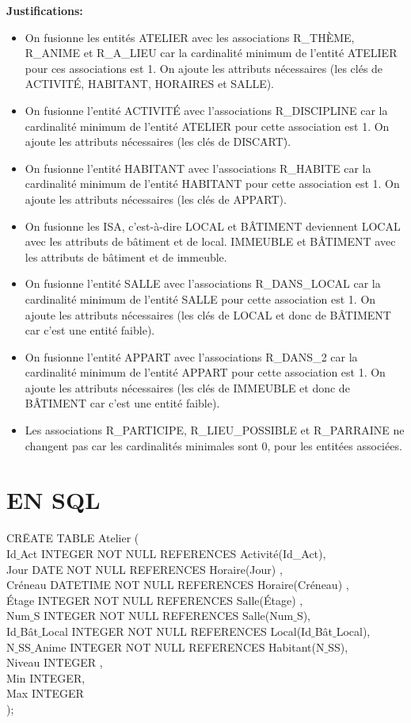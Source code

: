 \documentclass[a4paper,10.5pt]{report}
\begin{document}
	\textbf{Justifications: }
	\begin{itemize}
		\item	On fusionne les entités ATELIER avec les associations R\_THÈME, R\_ANIME et R\_A\_LIEU car la cardinalité minimum de l'entité ATELIER pour ces associations est 1. On ajoute les attributs nécessaires (les clés de ACTIVITÉ, HABITANT, HORAIRES et SALLE).
		\item	On fusionne l'entité ACTIVITÉ avec l'associations R\_DISCIPLINE car la cardinalité minimum de l'entité ATELIER pour cette association est 1. On ajoute les attributs nécessaires (les clés de DISC\. ART\.).
		\item	On fusionne l'entité HABITANT avec l'associations R\_HABITE car la cardinalité minimum de l'entité HABITANT pour cette association est 1. On ajoute les attributs nécessaires (les clés de APPART).
		\item On fusionne les ISA, c'est-à-dire LOCAL et BÂTIMENT deviennent LOCAL avec les attributs de bâtiment et de local. IMMEUBLE et BÂTIMENT avec les attributs de bâtiment et de immeuble.
		\item	On fusionne l'entité SALLE avec l'associations R\_DANS\_LOCAL car la cardinalité minimum de l'entité SALLE pour cette association est 1. On ajoute les attributs nécessaires (les clés de LOCAL et donc de BÂTIMENT car c'est une entité faible). 
		\item	On fusionne l'entité APPART avec l'associations R\_DANS\_2 car la cardinalité minimum de l'entité APPART pour cette association est 1. On ajoute les attributs nécessaires (les clés de IMMEUBLE et donc de BÂTIMENT car c'est une entité faible).
		\item Les associations R\_PARTICIPE, R\_LIEU\_POSSIBLE et R\_PARRAINE ne changent pas car les cardinalités minimales sont 0, pour les entitées associées.

	\end{itemize}
	\newpage
    \section{EN SQL}

		\begin{tabbing}
			CR\=EATE TABLE Atelier (\\
			\> Id$\_$Act INTEGER NOT NULL REFERENCES Activité(Id\_Act),\\
            \> Jour DATE NOT NULL REFERENCES Horaire(Jour) ,\\
            \> Créneau DATETIME NOT NULL REFERENCES Horaire(Créneau) ,\\
            \> Étage INTEGER NOT NULL REFERENCES Salle(Étage) ,\\
			\> Num$\_$S INTEGER NOT NULL REFERENCES Salle(Num$\_$S),\\
			\> Id$\_$Bât$\_$Local INTEGER NOT NULL REFERENCES Local(Id$\_$Bât$\_$Local),\\
			\> N$\_$SS$\_$Anime  INTEGER NOT NULL REFERENCES Habitant(N$\_$SS),\\
			\> Niveau INTEGER ,\\
			\> Min INTEGER,\\
			\> Max INTEGER\\);
		\end{tabbing}
\end{document}
